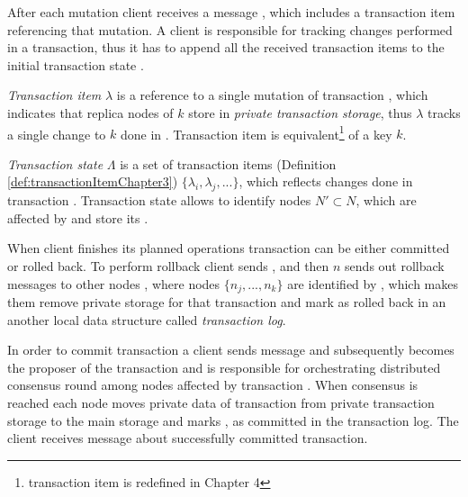 After each mutation client \client receives a message \updateTxStateMessage, which includes a transaction item \txItem referencing that mutation. A client is responsible for tracking changes performed in a transaction, thus it has to append all the received transaction items to the initial transaction state .


\begin{definition}
\label{def:transactionItemChapter3}
\emph{Transaction item}  $\lambda$ is a reference to a single mutation  of transaction \transaction, which indicates that replica nodes of $k$ store  in \emph{private transaction storage}, thus $\lambda$ tracks a single change to $k$ done in \transaction. Transaction item is equivalent\footnote{transaction item is redefined in Chapter 4} of a key $k$.
\end{definition}

\begin{definition}
\label{def:transactionStateChapter3}
\emph{Transaction state} $\Lambda$ is a set of transaction items (Definition \ref{def:transactionItemChapter3}) $\{\lambda_{i}, \lambda_{j}, ...\}$, which reflects changes done in transaction \transaction. Transaction state allows to identify nodes $N' \subset N$, which are affected by \transaction and store its \mutations.
\end{definition}



When client \client finishes its planned operations transaction \transaction can be either committed or rolled back. To perform rollback client sends \txRollbackMessage, and then $n$ sends out rollback messages to other nodes \rollbackMessage, where nodes $\{n_j,...,n_k\}$ are identified by \txItems, which 
makes them remove private storage for that transaction
and mark \transaction as rolled back in 
an another local data structure called \emph{transaction log}.

In order to commit transaction \transaction a client \client sends message \txCommitMessage and subsequently  becomes the proposer of the transaction and is responsible for orchestrating distributed consensus round among nodes affected by transaction \transaction.
When consensus is reached each node moves private data of transaction \transaction from private transaction storage to the main storage and marks \transaction, as committed in the transaction log. The client \client receives message \txCommitResonseMessage about successfully committed transaction.

